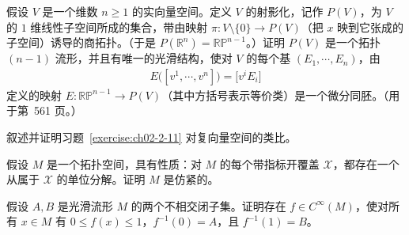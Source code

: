 \documentclass[../../main.tex]{subfiles}
\begin{document}
\begin{exercise}\label{exercise:ch02-2-11}
假设 $V$ 是一个维数 $n\geqslant 1$ 的实向量空间。定义 $V$ 的射影化，记作 $P(V)$，为 $V$ 的 $1$ 维线性子空间所成的集合，带由映射 $\pi:V\setminus\{0\}\to P(V)$（把 $x$ 映到它张成的子空间）诱导的商拓扑。（于是 $P(\mathbb{R}^{n})=\mathbb{RP}^{n-1}$。）证明 $P(V)$ 是一个拓扑 $(n-1)$ 流形，并且有唯一的光滑结构，使对 $V$ 的每个基 $(E_{1},\cdots ,E_{n})$，由
\begin{align*}
E\bigl([v^{1},\cdots ,v^{n}]\bigr)=\bigl[v^{i}E_{i}\bigr]
\end{align*}
定义的映射 $E:\mathbb{RP}^{n-1}\to P(V)$（其中方括号表示等价类）是一个微分同胚。（用于第~561 页。）
\end{exercise}

\begin{exercise}\label{exercise:ch02-2-12}
叙述并证明习题~\cref{exercise:ch02-2-11} 对复向量空间的类比。
\end{exercise}

\begin{exercise}\label{exercise:ch02-2-13}
假设 $M$ 是一个拓扑空间，具有性质：对 $M$ 的每个带指标开覆盖 $\mathcal{X}$，都存在一个从属于 $\mathcal{X}$ 的单位分解。证明 $M$ 是仿紧的。
\end{exercise}

\begin{exercise}\label{exercise:ch02-2-14}
假设 $A,B$ 是光滑流形 $M$ 的两个不相交闭子集。证明存在 $f\in C^{\infty}(M)$，使对所有 $x\in M$ 有 $0\leqslant f(x)\leqslant 1$，$f^{-1}(0)=A$，且 $f^{-1}(1)=B$。
\end{exercise}
\end{document}
